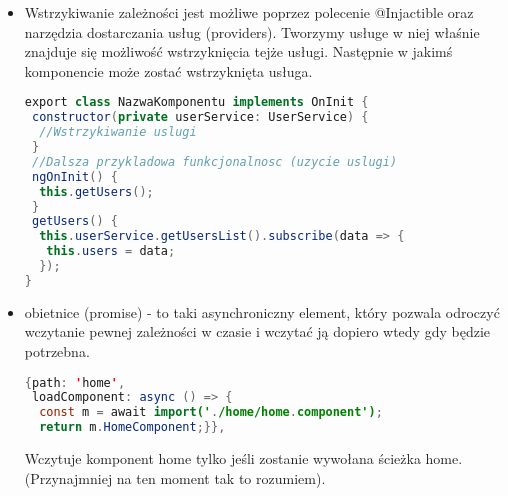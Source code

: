 \begin{itemize}
\begin{lstlisting}[language=Java, caption=Łączenie z serwerem]
  getUsersList(): Observable<User[]>{
    return this.httpClient.get<User[]>(`$\textdollar${this.baseUrl}`);
  }
}
	\end{lstlisting}
	\item Wstrzykiwanie zależności jest możliwe poprzez polecenie @Injactible oraz narzędzia dostarczania usług (providers). Tworzymy usługe w niej właśnie znajduje się możliwość wstrzyknięcia tejże usługi. Następnie w jakimś komponencie może zostać wstrzyknięta usługa.
	\begin{lstlisting}[language=Java, caption=Wstrzyknięcie serwisu]
export class NazwaKomponentu implements OnInit {
 constructor(private userService: UserService) {
  //Wstrzykiwanie uslugi
 }
 //Dalsza przykladowa funkcjonalnosc (uzycie uslugi)
 ngOnInit() {
  this.getUsers();
 }
 getUsers() {
  this.userService.getUsersList().subscribe(data => {
   this.users = data;
  });
}
	\end{lstlisting}
	\item obietnice (promise) - to taki asynchroniczny element, który pozwala odroczyć wczytanie pewnej zależności w czasie i wczytać ją dopiero wtedy gdy będzie potrzebna.
	\begin{lstlisting}[language=Java, caption=Promise]
{path: 'home',
 loadComponent: async () => {
  const m = await import('./home/home.component');
  return m.HomeComponent;}},
	\end{lstlisting}
	Wczytuje komponent home tylko jeśli zostanie wywołana ścieżka home. (Przynajmniej na ten moment tak to rozumiem).
	
\end{itemize}